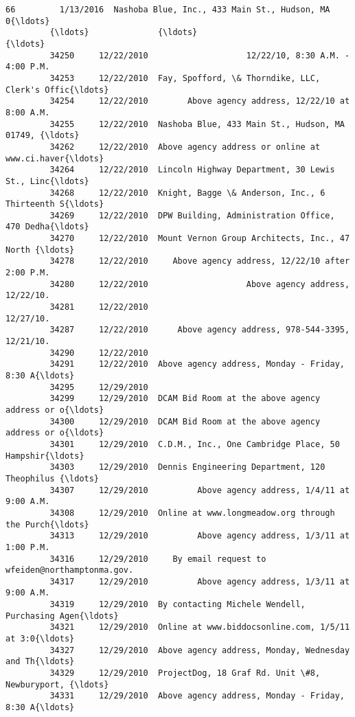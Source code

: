 \documentclass[11pt]{article}
\begin{document}
\begin{Verbatim}[commandchars=\\\{\}]
         66         1/13/2016  Nashoba Blue, Inc., 433 Main St., Hudson, MA 0{\ldots}   
         {\ldots}              {\ldots}                                                {\ldots}   
         34250     12/22/2010                    12/22/10, 8:30 A.M. - 4:00 P.M.   
         34253     12/22/2010  Fay, Spofford, \& Thorndike, LLC, Clerk's Offic{\ldots}   
         34254     12/22/2010        Above agency address, 12/22/10 at 8:00 A.M.   
         34255     12/22/2010  Nashoba Blue, 433 Main St., Hudson, MA 01749, {\ldots}   
         34262     12/22/2010  Above agency address or online at www.ci.haver{\ldots}   
         34264     12/22/2010  Lincoln Highway Department, 30 Lewis St., Linc{\ldots}   
         34268     12/22/2010  Knight, Bagge \& Anderson, Inc., 6 Thirteenth S{\ldots}   
         34269     12/22/2010  DPW Building, Administration Office, 470 Dedha{\ldots}   
         34270     12/22/2010  Mount Vernon Group Architects, Inc., 47 North {\ldots}   
         34278     12/22/2010     Above agency address, 12/22/10 after 2:00 P.M.   
         34280     12/22/2010                    Above agency address, 12/22/10.   
         34281     12/22/2010                                          12/27/10.   
         34287     12/22/2010      Above agency address, 978-544-3395, 12/21/10.   
         34290     12/22/2010                                                      
         34291     12/22/2010  Above agency address, Monday - Friday, 8:30 A{\ldots}   
         34295     12/29/2010                                                      
         34299     12/29/2010  DCAM Bid Room at the above agency address or o{\ldots}   
         34300     12/29/2010  DCAM Bid Room at the above agency address or o{\ldots}   
         34301     12/29/2010  C.D.M., Inc., One Cambridge Place, 50 Hampshir{\ldots}   
         34303     12/29/2010  Dennis Engineering Department, 120 Theophilus {\ldots}   
         34307     12/29/2010          Above agency address, 1/4/11 at 9:00 A.M.   
         34308     12/29/2010  Online at www.longmeadow.org through the Purch{\ldots}   
         34313     12/29/2010          Above agency address, 1/3/11 at 1:00 P.M.   
         34316     12/29/2010     By email request to wfeiden@northamptonma.gov.   
         34317     12/29/2010          Above agency address, 1/3/11 at 9:00 A.M.   
         34319     12/29/2010  By contacting Michele Wendell, Purchasing Agen{\ldots}   
         34321     12/29/2010  Online at www.biddocsonline.com, 1/5/11 at 3:0{\ldots}   
         34327     12/29/2010  Above agency address, Monday, Wednesday and Th{\ldots}   
         34329     12/29/2010  ProjectDog, 18 Graf Rd. Unit \#8, Newburyport, {\ldots}   
         34331     12/29/2010  Above agency address, Monday - Friday, 8:30 A{\ldots}   
         

\end{Verbatim}
\end{document}
